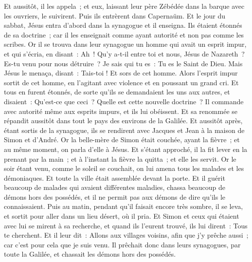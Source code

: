 \begin{multicols}{2}
Et aussitôt, il les appela~; et eux, laissant leur père Zébédée dans la barque avec les ouvriers, le suivirent.
Puis ils entrèrent dans Capernaüm. Et le jour du sabbat, Jésus entra d'abord dans la synagogue et il enseigna.
Ils étaient étonnés de sa doctrine~; car il les enseignait comme ayant autorité et non pas comme les scribes.
Or il se trouva dans leur synagogue un homme qui avait un esprit impur, et qui s'écria,
en disant~: Ah~! Qu'y a-t-il entre toi et nous, Jésus de Nazareth~? Es-tu venu pour nous détruire~? Je sais qui tu es~: Tu es le Saint de Dieu.
Mais Jésus le menaça, disant~: Tais-toi ! Et sors de cet homme.
Alors l'esprit impur sortit de cet homme, en l'agitant avec violence et en poussant un grand cri.
Et tous en furent étonnés, de sorte qu'ils se demandaient les uns aux autres, et disaient~: Qu'est-ce que ceci~? Quelle est cette nouvelle doctrine~? Il commande avec autorité même aux esprits impurs, et ils lui obéissent.
Et sa renommée se répandit aussitôt dans tout le pays des environs de la Galilée.
Et aussitôt après, étant sortis de la synagogue, ils se rendirent avec Jacques et Jean à la maison de Simon et d'André.
Or la belle-mère de Simon était couchée, ayant la fièvre~; et au même moment, on parla d'elle à Jésus.
Et s'étant approché, il la fit lever en la prenant par la main~; et à l'instant la fièvre la quitta~; et elle les servit.
Or le soir étant venu, comme le soleil se couchait, on lui amena tous les malades et les démoniaques.
Et toute la ville était assemblée devant la porte.
Et il guérit beaucoup de malades qui avaient différentes maladies, chassa beaucoup de démons hors des possédés, et il ne permit pas aux démons de dire qu'ils le connaissaient.
Puis au matin, pendant qu'il faisait encore très sombre, il se leva, et sortit pour aller dans un lieu désert, où il pria.
Et Simon et ceux qui étaient avec lui se mirent à sa recherche,
et quand ils l'eurent trouvé, ils lui dirent~: Tous te cherchent.
Et il leur dit~: Allons aux villages voisins, afin que j'y prêche aussi~; car c'est pour cela que je suis venu.
Il prêchait donc dans leurs synagogues, par toute la Galilée, et chassait les démons hors des possédés.

\end{multicols}
